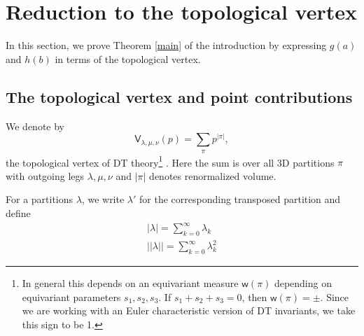 \documentclass{amsart}
\theoremstyle{definition}
\newcommand{\sfV}{\mathsf{V}}
\begin{document}
   
\section{Reduction to the topological vertex}  \label{vertex} 

In this section, we prove Theorem \ref{main} of the introduction by expressing $g(a)$ and $h(b)$ in terms of the topological vertex. 

\subsection{The topological vertex and point contributions}   

We denote by 
$$
\sfV_{\lambda,\mu,\nu}(p) = \sum_{\pi} p^{|\pi|}, 
$$
the topological vertex of DT theory\footnote{In general this depends on an equivariant measure $\mathsf{w}(\pi)$ depending on equivariant parameters $s_1, s_2, s_3$. If $s_1+s_2+s_3=0$, then $\mathsf{w}(\pi) = \pm$. Since we are working with an Euler characteristic version of DT invariants, we take this sign to be 1.} \cite{MNOP2}. Here the sum is over all 3D partitions $\pi$ with outgoing legs $\lambda, \mu, \nu$ and $|\pi|$ denotes renormalized volume. 

For a partitions $\lambda$, we write $\lambda'$ for the corresponding transposed partition and define \cite{ORV}
\begin{align*}
|\lambda| = \sum_{k=0}^{\infty} \lambda_k \\
|\!|\lambda|\!| = \sum_{k=0}^{\infty} \lambda_{k}^{2}
\end{align*}
\end{document}
